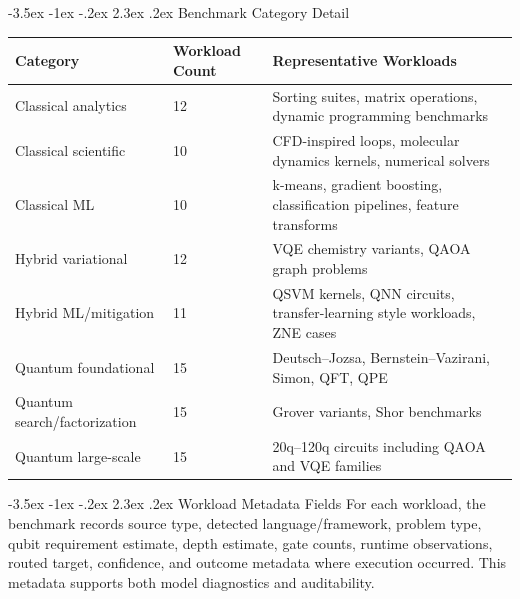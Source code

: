 \documentclass[12pt,a4paper]{report}
\makeatletter
\renewcommand\section{\@startsection{section}{1}{\z@}%
  {-3.5ex \@plus -1ex \@minus -.2ex}%
  {2.3ex \@plus.2ex}%
  {\normalfont\bfseries\fontsize{12pt}{16pt}\selectfont}}
\makeatother
\begin{document}
\section{Benchmark Category Detail}
\small
\begin{longtable}{p{}p{}p{}}
\toprule
\textbf{Category} & \textbf{Workload Count} & \textbf{Representative Workloads} \\
\midrule
Classical analytics & 12 & Sorting suites, matrix operations, dynamic programming benchmarks \\
Classical scientific & 10 & CFD-inspired loops, molecular dynamics kernels, numerical solvers \\
Classical ML & 10 & k-means, gradient boosting, classification pipelines, feature transforms \\
Hybrid variational & 12 & VQE chemistry variants, QAOA graph problems \\
Hybrid ML/mitigation & 11 & QSVM kernels, QNN circuits, transfer-learning style workloads, ZNE cases \\
Quantum foundational & 15 & Deutsch--Jozsa, Bernstein--Vazirani, Simon, QFT, QPE \\
Quantum search/factorization & 15 & Grover variants, Shor benchmarks \\
Quantum large-scale & 15 & 20q--120q circuits including QAOA and VQE families \\
\bottomrule
\end{longtable}
\normalsize

\section{Workload Metadata Fields}
For each workload, the benchmark records source type, detected language/framework, problem type, qubit requirement estimate, depth estimate, gate counts, runtime observations, routed target, confidence, and outcome metadata where execution occurred. This metadata supports both model diagnostics and auditability.
\end{document}
